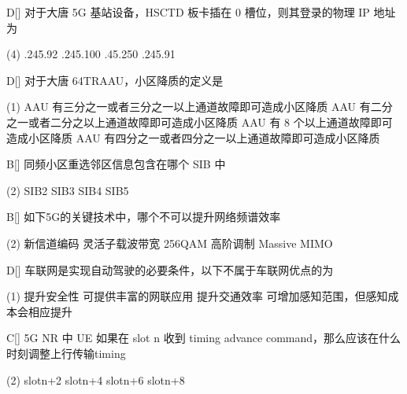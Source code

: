 \begin{choice}{D}[]
    对于大唐 5G 基站设备，HSCTD 板卡插在 0 槽位，则其登录的物理 IP 地址为
    \begin{tasks}(4)
        .245.92
        .245.100
        .45.250
        .245.91
    \end{tasks}
\end{choice}


\begin{choice}{D}[]
    对于大唐 64TRAAU，小区降质的定义是
    \begin{tasks}(1)
        \task AAU 有三分之一或者三分之一以上通道故障即可造成小区降质
        \task AAU 有二分之一或者二分之以上通道故障即可造成小区降质
        \task AAU 有 8 个以上通道故障即可造成小区降质
        \task AAU 有四分之一或者四分之一以上通道故障即可造成小区降质
    \end{tasks}
\end{choice}


\begin{choice}{B}[]
    同频小区重选邻区信息包含在哪个 SIB 中
    \begin{tasks}(2)
        \task SIB2
        \task SIB3
        \task SIB4
        \task  SIB5
    \end{tasks}
\end{choice}


\begin{choice}{B}[]
    如下5G的关键技术中，哪个不可以提升网络频谱效率
    \begin{tasks}(2)
        \task 新信道编码
        \task 灵活子载波带宽
        \task 256QAM 高阶调制
        \task Massive \;MIMO
    \end{tasks}
\end{choice}

\begin{choice}{D}[]
    车联网是实现自动驾驶的必要条件，以下不属于车联网优点的为
    \begin{tasks}(1)
        \task 提升安全性
        \task 可提供丰富的网联应用
        \task 提升交通效率
        \task 可增加感知范围，但感知成本会相应提升
    \end{tasks}
\end{choice}

\begin{choice}{C}[]
    5G NR 中 UE 如果在 slot n 收到 timing advance command，那么应该在什么时刻调整上行传输timing
    \begin{tasks}(2)
        \task slot\;n+2
        \task slot\;n+4
        \task slot\;n+6
        \task slot\;n+8
    \end{tasks}
\end{choice}




